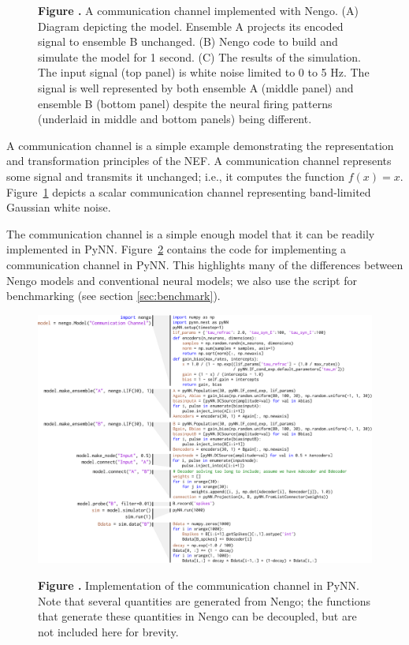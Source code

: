\documentclass{frontiersSCNS}
\begin{document}
\begin{figure}
\begin{center}
\begin{minipage}{0.3\textwidth}
  \end{minipage}
\end{center}
 \textbf{\label{fig:comm-channel}
   Figure .}{
   A communication channel implemented with Nengo.
   (A) Diagram depicting the model. Ensemble A
   projects its encoded signal to ensemble B unchanged.
   (B) Nengo code to build and simulate the model
   for 1 second.
   (C) The results of the simulation.
   The input signal (top panel) is white noise limited to 0 to 5 Hz.
   The signal is well represented by both ensemble A (middle panel)
   and ensemble B (bottom panel) despite the neural firing patterns
   (underlaid in middle and bottom panels) being different.}
\end{figure}

A communication channel
is a simple example demonstrating
the representation and transformation principles
of the NEF.
A communication channel
represents some signal and transmits it unchanged;
i.e., it computes the function $f(x) = x$.
Figure~\ref{fig:comm-channel}
depicts a scalar communication channel
representing band-limited Gaussian white noise.

The communication channel
is a simple enough model
that it can be readily implemented in PyNN.
Figure~\ref{fig:pynn} contains the code
for implementing a communication channel in PyNN.
This highlights many of the differences
between Nengo models and conventional neural models;
we also use the script for benchmarking
(see section \ref{sec:benchmark}).

\begin{figure}
\begin{center}
  \includegraphics[width=\textwidth]{pynn}
\end{center}
 \textbf{\label{fig:pynn} Figure .}{
   Implementation of the communication channel in PyNN.
   Note that several quantities are generated from Nengo;
   the functions that generate these quantities in Nengo
   can be decoupled, but are not included here for brevity.}
\end{figure}
\end{document}
